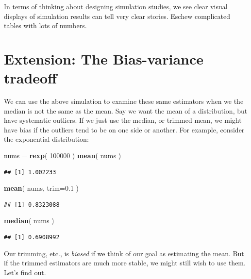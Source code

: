 \documentclass[
]{book}
\newenvironment{Shaded}{\begin{snugshade}}{\end{snugshade}}
\newcommand{\AttributeTok}[1]{\textcolor[rgb]{0.13,0.29,0.53}{#1}}
\newcommand{\DecValTok}[1]{\textcolor[rgb]{0.00,0.00,0.81}{#1}}
\newcommand{\FloatTok}[1]{\textcolor[rgb]{0.00,0.00,0.81}{#1}}
\newcommand{\FunctionTok}[1]{\textcolor[rgb]{0.13,0.29,0.53}{\textbf{#1}}}
\newcommand{\NormalTok}[1]{#1}
\newcommand{\OtherTok}[1]{\textcolor[rgb]{0.56,0.35,0.01}{#1}}
\begin{document}
In terms of thinking about designing simulation studies, we see clear
visual displays of simulation results can tell very clear stories. Eschew
complicated tables with lots of numbers.

\section{Extension: The Bias-variance tradeoff}\label{extension-the-bias-variance-tradeoff}

We can use the above simulation to examine these same estimators when we the
median is not the same as the mean. Say we want the mean of a distribution,
but have systematic outliers. If we just use the median, or trimmed mean, we
might have bias if the outliers tend to be on one side or another. For
example, consider the exponential distribution:

\begin{Shaded}
\begin{Highlighting}[]
\NormalTok{nums }\OtherTok{=} \FunctionTok{rexp}\NormalTok{( }\DecValTok{100000}\NormalTok{ )}
\FunctionTok{mean}\NormalTok{( nums )}
\end{Highlighting}
\end{Shaded}

\begin{verbatim}
## [1] 1.002233
\end{verbatim}

\begin{Shaded}
\begin{Highlighting}[]
\FunctionTok{mean}\NormalTok{( nums, }\AttributeTok{trim=}\FloatTok{0.1}\NormalTok{ )}
\end{Highlighting}
\end{Shaded}

\begin{verbatim}
## [1] 0.8323088
\end{verbatim}

\begin{Shaded}
\begin{Highlighting}[]
\FunctionTok{median}\NormalTok{( nums )}
\end{Highlighting}
\end{Shaded}

\begin{verbatim}
## [1] 0.6908992
\end{verbatim}

Our trimming, etc., is \emph{biased} if we think of our goal as estimating the
mean. But if the trimmed estimators are much more stable, we might still
wish to use them. Let's find out.
\end{document}
